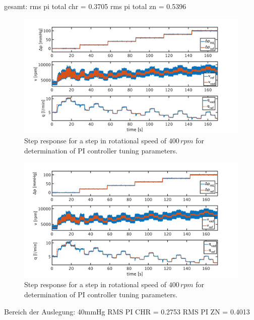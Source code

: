 gesamt:
rms pi total chr = 0.3705
rms pi total zn = 0.5396
\begin{figure}[ht]
  \centering
  \includegraphics[width=\textwidth]{images/chapt_5/pi_contr_chr.pdf}
  \caption[Step response for determination of PI controller tuning parameters]{Step response for a step in rotational speed of $400\,rpm$ for determination of PI controller tuning parameters.}
  \label{fig:pi_contr_chr}
\end{figure}

\begin{figure}[ht]
  \centering
  \includegraphics[width=\textwidth]{images/chapt_5/pi_contr_zn.pdf}
  \caption[Step response for determination of PI controller tuning parameters]{Step response for a step in rotational speed of $400\,rpm$ for determination of PI controller tuning parameters.}
  \label{fig:pi_contr_zn}
\end{figure}

Bereich der Auslegung: 40mmHg
RMS PI CHR = 0.2753
RMS PI ZN = 0.4013

